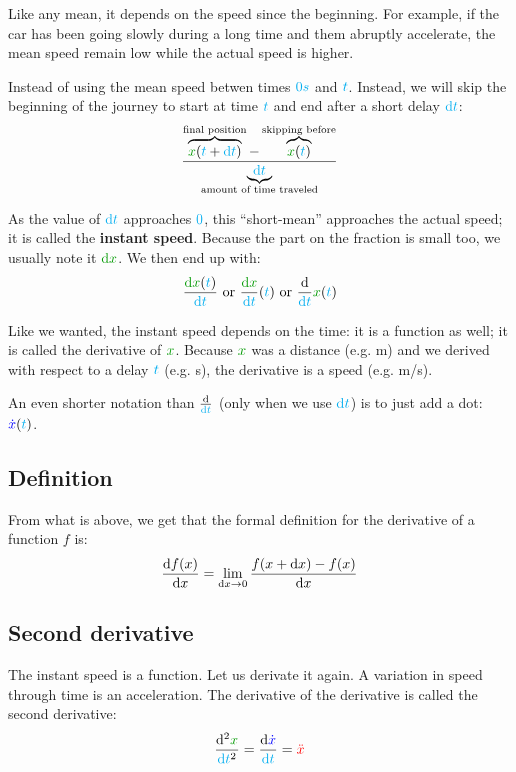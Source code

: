 Like any mean, it depends on the speed since the beginning. For example,
if the car has been going slowly during a long time and them abruptly
accelerate, the mean speed remain low while the actual speed is higher.

Instead of using the mean speed betwen times $\textcolor{cyan}{0s}$ and
$\textcolor{cyan}{t}$. Instead, we will skip the beginning of the journey to start
at time $\textcolor{cyan}{t}$ and end after a short delay $\textcolor{cyan}{\mathrm{d} t}$:
\[
\frac {
	\overbrace{\dist{x}(\delay{t}+\delay{\dt})}^{\text{final position}}
	- \overbrace{\dist{x}(\delay{t})}^{\text{skipping before}}
} {\underbrace{\delay{\dt}}_{\text{amount of time traveled}}}
\]

As the value of $\textcolor{cyan}{\mathrm{d} t}$ approaches $\textcolor{cyan}{0}$, this
“short-mean” approaches the actual speed; it is called the
\textbf{instant speed}. Because the part on the fraction is small too,
we usually note it $\dist{\d x}$. We then end up with:
\[
\frac {\dist{\d x}(\delay{t})} {\delay{\dt}}
\text{ or }
\frac {\dist{\d x}} {\delay{\dt}}(\delay{t})
\text{ or }
\frac {\d} {\delay{\dt}} \dist{x}(\delay{t})
\]

Like we wanted, the instant speed depends on the time: it is a function
as well; it is called the derivative of $\dist{x}$. Because $\dist{x}$
was a distance (e.g. m) and we derived with respect to a delay $\textcolor{cyan}{t}$
(e.g. s), the derivative is a speed (e.g. m/s).

\begin{remark}
An even shorter notation than $\frac {\mathrm{d}} {\textcolor{cyan}{\mathrm{d} t}}$ (only when we
use $\textcolor{cyan}{\mathrm{d} t}$) is to just add a dot: $\textcolor{blue}{\dot x}(\textcolor{cyan}{t})$.
\end{remark}


\subsection{Definition}

From what is above, we get that the formal definition for the derivative
of a function $f$ is:
\[
\frac {\mathrm{d} f(x)} {\mathrm{d} x}
= \lim_{\mathrm{d} x \rightarrow 0} \frac {f(x+\mathrm{d} x) - f(x)} {\mathrm{d} x}
\]


\subsection{Second derivative}

The instant speed is a function. Let us derivate it again. A variation in
speed through time is an acceleration.  The derivative of the derivative
is called the second derivative: \[
\frac {\d^2 \dist{x}} {\delay{\dt}^2}
= \frac {\d \speed{\dot x}} {\delay{\dt}}
= \accel{\ddot x}
\]


